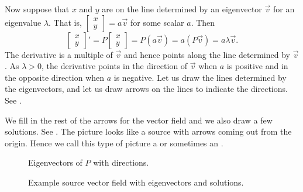 \documentclass[12pt]{book}
\begin{document}
Now suppose that $x$ and $y$ are on the line determined by an eigenvector
$\vec{v}$ for an eigenvalue $\lambda$.
That is,
$\left[ \begin{smallmatrix} x \\ y \end{smallmatrix} \right] = a \vec{v}$
for some scalar $a$.
Then 
\begin{equation*}
\begin{bmatrix} x \\ y \end{bmatrix} '
=
P \begin{bmatrix} x \\ y \end{bmatrix}
=
P ( a \vec{v} ) =  a ( P \vec{v} )
= a \lambda \vec{v} .
\end{equation*}
The derivative is a multiple of $\vec{v}$ and hence points along the
line determined by $\vec{v}$.  As $\lambda > 0$, the derivative points in the
direction of $\vec{v}$ when $a$ is positive and in the opposite direction when
$a$ is negative.  Let us draw the lines determined by
the eigenvectors, and let us draw
arrows on the lines to indicate the directions.
See .

We fill in the rest of the arrows for the vector field
and we also draw a few solutions.  See
.
The picture looks like a source
with arrows coming out from the origin.
Hence we call this type of picture a
\emph{} or sometimes an \emph{}.

\begin{figure}[h!t]
\begin{center}
\parbox[t]{3.1in}{
 \capstart
 \caption{Eigenvectors of $P$ with directions.\label{pln:source-eig-arrfig}}
}
\quad
\parbox[t]{3.1in}{
 \capstart
 \caption{Example source vector field with eigenvectors and
 solutions.\label{pln:source-fullfig}}
}
\end{center}
\end{figure}

\medskip
\end{document}

